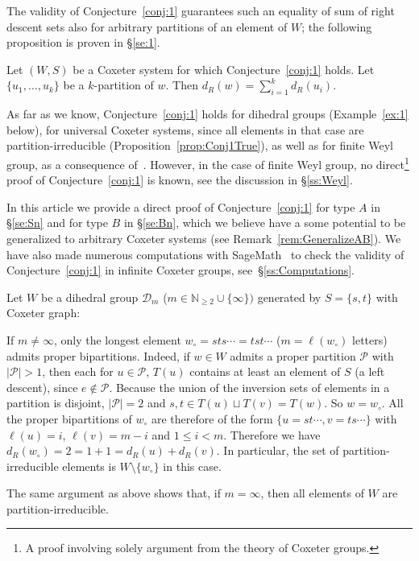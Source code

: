 \documentclass[Unicode]{cedram-alco}
\theoremstyle{definition}
\begin{document}
The validity of Conjecture~\ref{conj:1} guarantees such an equality of sum of right descent sets also for arbitrary partitions of an element of $W$; the following proposition  is proven in \S\ref{se:1}.

\begin{prop}\label{prop:Conj} Let $(W,S)$ be a Coxeter system for which Conjecture~\ref{conj:1} holds. Let $\{u_1,\dots,u_k\}$ be a $k$-partition of $w$. Then $d_R(w)=\sum_{i=1}^k d_R(u_i)$.
\end{prop}

As far as we know, Conjecture~\ref{conj:1} holds for dihedral groups (Example~\ref{ex:1} below), for universal Coxeter systems, since all elements in that case are partition-irreducible  (Proposition~\ref{prop:Conj1True}), as well as for finite Weyl group, as a consequence of~\cite{FrRe23}. However, in the case of finite Weyl group, no direct\footnote{A proof involving solely argument from the theory of Coxeter groups.} proof of Conjecture~\ref{conj:1} is known, see the discussion in \S\ref{ss:Weyl}.  

 In this article we provide a direct proof of Conjecture~\ref{conj:1} for type $A$ in \S\ref{se:Sn} and for type $B$ in \S\ref{se:Bn}, which we believe have a some potential to be generalized to arbitrary Coxeter systems (see Remark~\ref{rem:GeneralizeAB}).  We have also made numerous computations with SageMath~\cite{sage} to check the validity of Conjecture~\ref{conj:1} in infinite Coxeter groups, see~\S\ref{ss:Computations}. 

\begin{ex}\label{ex:1}  Let $W$ be a dihedral group $\mathcal D_m$ ($m\in\mathbb N_{\geq 2}\cup\{\infty\})$ generated by $S=\{s,t\}$ with Coxeter graph:
\begin{center}
\end{center}
If $m\not=\infty$, only the longest element $w_\circ = sts\cdots=tst\cdots$ ($m=\ell(w_\circ)$ letters)  admits proper bipartitions. Indeed, if $w\in W$ admits a proper partition $\mathcal P$ with $|\mathcal P|>1$, then each for $u\in\mathcal P$, $T(u)$ contains at least an element of $S$ (a left descent), since $e\not\in \mathcal P$. Because the union of the inversion sets of elements in a partition is disjoint,   $|\mathcal P|=2$ and $s,t\in T(u)\sqcup T(v)=T(w)$. So $w=w_\circ$.  All the proper bipartitions of $w_\circ$ are therefore of the form $\{u=st\cdots, v=ts\cdots\}$ with $\ell(u)=i$, $\ell(v)=m-i$ and $1\leq i<m$.   Therefore we have $d_R(w_\circ)=2=1+1=d_R(u)+d_R(v)$.
In particular, the set of partition-irreducible elements is $W\setminus\{w_\circ\}$ in this case.

The same argument as above shows that, if $m=\infty$, then all elements of $W$ are partition-irreducible. 
\end{ex}
\end{document}

